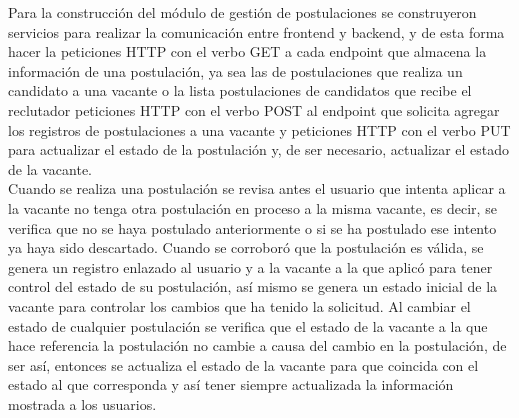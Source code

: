 Para la construcción del módulo de gestión de postulaciones se construyeron servicios para realizar la comunicación entre frontend y backend, y de esta forma hacer la peticiones HTTP con el verbo GET a cada endpoint que almacena la información de una postulación, ya sea las de postulaciones que realiza un candidato a una vacante o la lista postulaciones de candidatos que recibe el reclutador peticiones HTTP con el verbo POST al endpoint que solicita agregar los registros de postulaciones a una vacante y peticiones HTTP con el verbo PUT para actualizar el estado de la postulación y, de ser necesario, actualizar el estado de la vacante.\\
\newline
Cuando se realiza una postulación se revisa antes el usuario que intenta aplicar a la vacante no tenga otra postulación en proceso a la misma vacante, es decir, se verifica que no se haya postulado anteriormente o si se ha postulado ese intento ya haya sido descartado. Cuando se corroboró que la postulación es válida, se genera un registro enlazado al usuario y a la vacante a la que aplicó para tener control del estado de su postulación, así mismo se genera un estado inicial de la vacante para controlar los cambios que ha tenido la solicitud. Al cambiar el estado de cualquier postulación se verifica que el estado de la  vacante a la que hace referencia la postulación no cambie a causa del cambio en la postulación, de ser así, entonces se actualiza el estado de la vacante para que coincida con el estado al que corresponda y así tener siempre actualizada la información mostrada a los usuarios.
